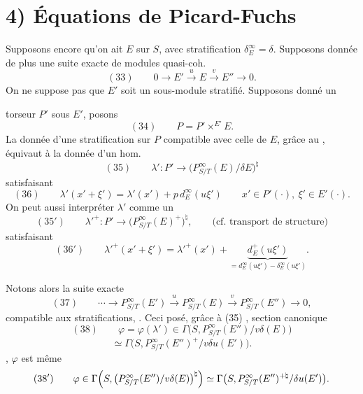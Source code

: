 \documentclass[11pt,a4paper]{article}
\begin{document}
\section{4) Équations de Picard-Fuchs}

Supposons encore qu'on ait $E$ sur $S$, avec
stratification $\delta^\infty_E = \delta$. Supposons donnée de plus
une suite exacte de modules quasi-coh.
\[
(33)\qquad 0 \longrightarrow E' \xrightarrow{\ u\ } E \xrightarrow{\ v\ } E'' \longrightarrow 0 .
\]
On ne suppose pas que $E'$ soit un sous-module
stratifié. \struck{\ill{}} Supposons donné un

torseur $P'$ sous $E'$, posons
\[
(34)\qquad P = P' \times^{E'} E .
\]
La donnée d'une stratification sur $P$ compatible avec
celle de $E$, grâce au , équivaut à la donnée
d'un hom.
\[
(35)\qquad \lambda' : P' \longrightarrow \bigl(P^\infty_{S/T}(E)/\delta E\bigr)^{\natural}
\]
satisfaisant
\[
(36)\qquad \lambda'(x' + \xi') = \lambda'(x') + p\,d^\infty_E(u\xi') \qquad x' \in P'(\cdot),\ \xi' \in E'(\cdot) .
\]
On peut aussi interpréter $\lambda'$ comme un
\[
(35')\qquad \lambda'^{+} : P' \longrightarrow \bigl(P^\infty_{S/T}(E)^+\bigr)^{\natural} , \qquad \text{(cf. transport de structure)}
\]
satisfaisant
\[
(36')\qquad \lambda'^{+}(x' + \xi') = \lambda'^{+}(x') + \underbrace{d^+_E(u\xi')}_{= d^\infty_E(u\xi') - \delta^\infty_E(u\xi')} .
\]

 

 Notons alors la suite exacte
\[
(37)\qquad \cdots \longrightarrow P^\infty_{S/T}(E') \xrightarrow{\ u\ } P^\infty_{S/T}(E) \xrightarrow{\ v\ } P^\infty_{S/T}(E'') \longrightarrow 0 ,
\]
compatible aux stratifications, .
Ceci posé, grâce à (35) ,  section canonique
\[
(38)\qquad \varphi = \varphi(\lambda') \in \Gamma\bigl(S, P^\infty_{S/T}(E'')/v\delta(E)\bigr)
\]
\[
\simeq \Gamma\bigl(S, P^\infty_{S/T}(E'')^+/v\delta u(E')\bigr) .
\]
, $\varphi$ est \struck{\ill{}} même
\[
(38')\qquad \varphi \in \Gamma\Bigl(S, \bigl(P^\infty_{S/T}(E'')/v\delta(E)\bigr)^{\natural}\Bigr) \simeq \Gamma\bigl(S, P^\infty_{S/T}(E'')^{+\natural}/\delta u(E')\bigr) .
\]
\end{document}
